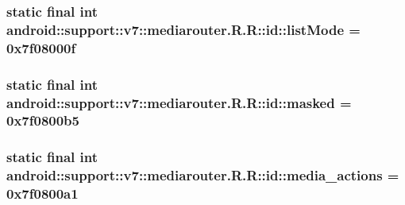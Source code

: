 \hypertarget{classandroid_1_1support_1_1v7_1_1mediarouter_1_1_r_1_1id_5f41e6d5e34195d5967ee2500b01233e}{
\subsubsection[{listMode}]{\setlength{\rightskip}{0pt plus 5cm}static final int android::support::v7::mediarouter.R.R::id::listMode = 0x7f08000f}}
\label{classandroid_1_1support_1_1v7_1_1mediarouter_1_1_r_1_1id_5f41e6d5e34195d5967ee2500b01233e}


\hypertarget{classandroid_1_1support_1_1v7_1_1mediarouter_1_1_r_1_1id_c3c47293d2f75abe5b9fd9f15c59923a}{
\subsubsection[{masked}]{\setlength{\rightskip}{0pt plus 5cm}static final int android::support::v7::mediarouter.R.R::id::masked = 0x7f0800b5}}
\label{classandroid_1_1support_1_1v7_1_1mediarouter_1_1_r_1_1id_c3c47293d2f75abe5b9fd9f15c59923a}


\hypertarget{classandroid_1_1support_1_1v7_1_1mediarouter_1_1_r_1_1id_137013cd2f6b25faa1d0b6f4e5c637d7}{
\subsubsection[{media\_\-actions}]{\setlength{\rightskip}{0pt plus 5cm}static final int android::support::v7::mediarouter.R.R::id::media\_\-actions = 0x7f0800a1}}
\label{classandroid_1_1support_1_1v7_1_1mediarouter_1_1_r_1_1id_137013cd2f6b25faa1d0b6f4e5c637d7}


